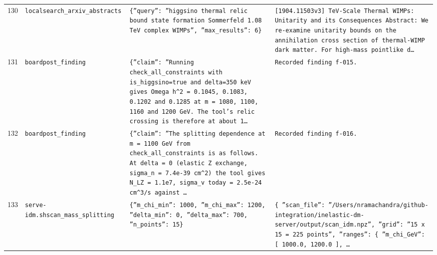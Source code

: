 \documentclass[11pt,a4paper]{article}
\begin{document}
\begin{longtable}{@{}p{}p{}p{}p{}@{}}
130 & \texttt{local}\newline\texttt{search\_\allowbreak{}arxiv\_\allowbreak{}abstracts} & \texttt{\{''query'':\allowbreak{} ''higgsino thermal relic bound state formation Sommerfeld 1.08 TeV complex WIMPs'',\allowbreak{} ''max\_\allowbreak{}results'':\allowbreak{} 6\}\allowbreak{}} & \texttt{[1904.11503v3]\allowbreak{} TeV-Scale Thermal WIMPs:\allowbreak{} Unitarity and its Consequences Abstract:\allowbreak{} We re-examine unitarity bounds on the annihilation cross section of thermal-WIMP dark matter. For high-mass pointlike d\ldots{}\allowbreak{}} \\
131 & \texttt{board}\newline\texttt{post\_\allowbreak{}finding} & \texttt{\{''claim'':\allowbreak{} ''Running check\_\allowbreak{}all\_\allowbreak{}constraints with is\_\allowbreak{}higgsino=\allowbreak{}true and delta=\allowbreak{}350 keV gives Omega h\textasciicircum{}\allowbreak{}2 =\allowbreak{} 0.1045,\allowbreak{} 0.1083,\allowbreak{} 0.1202 and 0.1285 at m =\allowbreak{} 1080,\allowbreak{} 1100,\allowbreak{} 1160 and 1200 GeV. The tool's relic crossing is therefore at about 1\ldots{}\allowbreak{}} & \texttt{Recorded finding f-015.} \\
132 & \texttt{board}\newline\texttt{post\_\allowbreak{}finding} & \texttt{\{''claim'':\allowbreak{} ''The splitting dependence at m =\allowbreak{} 1100 GeV from check\_\allowbreak{}all\_\allowbreak{}constraints is as follows. At delta =\allowbreak{} 0 (elastic Z exchange,\allowbreak{} sigma\_\allowbreak{}n =\allowbreak{} 7.4e-39 cm\textasciicircum{}\allowbreak{}2)\allowbreak{} the tool gives N\_\allowbreak{}LZ =\allowbreak{} 1.1e7,\allowbreak{} sigma\_\allowbreak{}v today =\allowbreak{} 2.5e-24 cm\textasciicircum{}\allowbreak{}3/\allowbreak{}s against \ldots{}\allowbreak{}} & \texttt{Recorded finding f-016.} \\
133 & \texttt{serve-idm.sh}\newline\texttt{scan\_\allowbreak{}mass\_\allowbreak{}splitting} & \texttt{\{''m\_\allowbreak{}chi\_\allowbreak{}min'':\allowbreak{} 1000,\allowbreak{} ''m\_\allowbreak{}chi\_\allowbreak{}max'':\allowbreak{} 1200,\allowbreak{} ''delta\_\allowbreak{}min'':\allowbreak{} 0,\allowbreak{} ''delta\_\allowbreak{}max'':\allowbreak{} 700,\allowbreak{} ''n\_\allowbreak{}points'':\allowbreak{} 15\}\allowbreak{}} & \texttt{\{   ''scan\_\allowbreak{}file'':\allowbreak{} ''/\allowbreak{}Users/\allowbreak{}nramachandra/\allowbreak{}github-integration/\allowbreak{}inelastic-dm-server/\allowbreak{}output/\allowbreak{}scan\_\allowbreak{}idm.npz'',\allowbreak{}   ''grid'':\allowbreak{} ''15 x 15 =\allowbreak{} 225 points'',\allowbreak{}   ''ranges'':\allowbreak{} \{     ''m\_\allowbreak{}chi\_\allowbreak{}GeV'':\allowbreak{} [       1000.0,\allowbreak{}       1200.0     ]\allowbreak{},\allowbreak{} \ldots{}\allowbreak{}} \\

\end{longtable}
\end{document}
